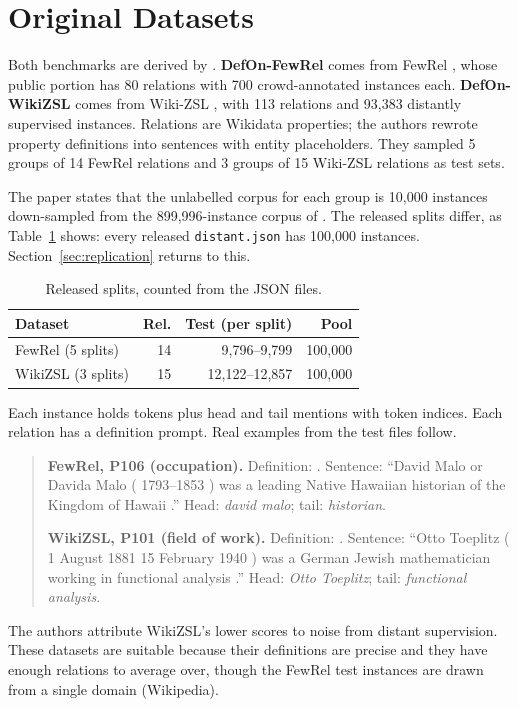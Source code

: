 \section{Original Datasets}
\label{sec:original}

Both benchmarks are derived by \citet{zhou2024grasping}. \textbf{DefOn-FewRel} comes from FewRel \citep{han2018fewrel}, whose public portion has 80 relations with 700 crowd-annotated instances each. \textbf{DefOn-WikiZSL} comes from Wiki-ZSL \citep{chen2021zs}, with 113 relations and 93,383 distantly supervised instances. Relations are Wikidata properties; the authors rewrote property definitions into sentences with entity placeholders. They sampled 5 groups of 14 FewRel relations and 3 groups of 15 Wiki-ZSL relations as test sets.

The paper states that the unlabelled corpus for each group is 10,000 instances down-sampled from the 899,996-instance corpus of \citet{gao2020neural}. The released splits differ, as Table~\ref{tab:splits} shows: every released \texttt{distant.json} has 100,000 instances. Section~\ref{sec:replication} returns to this.

\begin{table}[t]
\centering\small
\begin{tabular}{lrrr}
\toprule
Dataset & Rel. & Test (per split) & Pool \\
\midrule
FewRel (5 splits) & 14 & 9,796--9,799 & 100,000 \\
WikiZSL (3 splits) & 15 & 12,122--12,857 & 100,000 \\
\bottomrule
\end{tabular}
\caption{Released splits, counted from the JSON files.}
\label{tab:splits}
\end{table}

Each instance holds tokens plus head and tail mentions with token indices. Each relation has a definition prompt. Real examples from the test files follow.

\begin{quote}\small
\textbf{FewRel, P106 (occupation).} Definition: .
Sentence: ``David Malo or Davida Malo ( 1793--1853 ) was a leading Native Hawaiian historian of the Kingdom of Hawaii .''
Head: \emph{david malo}; tail: \emph{historian}.

\textbf{WikiZSL, P101 (field of work).} Definition: .
Sentence: ``Otto Toeplitz ( 1 August 1881 15 February 1940 ) was a German Jewish mathematician working in functional analysis .''
Head: \emph{Otto Toeplitz}; tail: \emph{functional analysis}.
\end{quote}

The authors attribute WikiZSL's lower scores to noise from distant supervision. These datasets are suitable because their definitions are precise and they have enough relations to average over, though the FewRel test instances are drawn from a single domain (Wikipedia).
